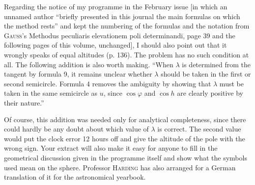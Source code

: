 \par\indent Regarding the notice of my programme in the February issue [in which an unnamed author “briefly presented in this journal the main formulas on which the method rests” and kept the numbering of the formulas and the notation from \textsc{Gauss}’s Methodus peculiaris elevationem poli determinandi, page 39 and the following pages of this volume, unchanged], I should also point out that it wrongly speaks of equal altitudes (p. 136). The problem has no such condition at all. The following addition is also worth making. “When $\lambda$ is determined from the tangent by formula 9, it remains unclear whether $\lambda$ should be taken in the first or second semicircle. Formula 4 removes the ambiguity by showing that $\lambda$ must be taken in the same semicircle as $u$, since $\cos\varphi$ and $\cos h$ are clearly positive by their nature.”

\par\indent Of course, this addition was needed only for analytical completeness, since there could hardly be any doubt about which value of $\lambda$ is correct. The second value would put the clock error 12 hours off and give the altitude of the pole with the wrong sign. Your extract will also make it easy for anyone to fill in the geometrical discussion given in the programme itself and show what the symbols used mean on the sphere. Professor \textsc{Harding} has also arranged for a German translation of it for the astronomical yearbook.
